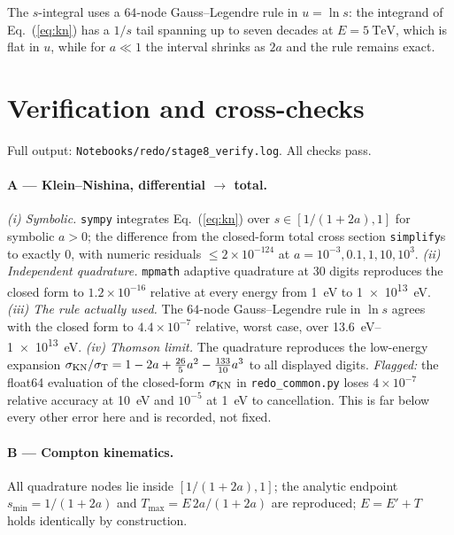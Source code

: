 \documentclass[11pt,a4paper]{article}
\begin{document}
The $s$-integral uses a $64$-node Gauss--Legendre rule in $u=\ln s$: the
integrand of Eq.~(\ref{eq:kn}) has a $1/s$ tail spanning up to seven decades
at $E=\SI{5}{\tera\electronvolt}$, which is flat in $u$, while for $a\ll1$
the interval shrinks as $2a$ and the rule remains exact.

\section{Verification and cross-checks}\label{sec:verif}

Full output: \texttt{Notebooks/redo/stage8\_verify.log}. All checks pass.

\paragraph{A --- Klein--Nishina, differential $\to$ total.}
\emph{(i) Symbolic.} \texttt{sympy} integrates Eq.~(\ref{eq:kn}) over
$s\in[1/(1+2a),1]$ for symbolic $a>0$; the difference from the closed-form
total cross section \texttt{simplify}s to exactly $0$, with numeric residuals
$\le 2\times10^{-124}$ at $a=10^{-3},0.1,1,10,10^{3}$.
\emph{(ii) Independent quadrature.} \texttt{mpmath} adaptive quadrature at
30 digits reproduces the closed form to $1.2\times10^{-16}$ relative at every
energy from \SI{1}{\electronvolt} to \SI{1e13}{\electronvolt}.
\emph{(iii) The rule actually used.} The $64$-node Gauss--Legendre rule in
$\ln s$ agrees with the closed form to $4.4\times10^{-7}$ relative, worst
case, over \SIrange{13.6}{1e13}{\electronvolt}.
\emph{(iv) Thomson limit.} The quadrature reproduces the low-energy expansion
$\sigma_{\rm KN}/\sigma_{\rm T} = 1-2a+\tfrac{26}{5}a^2-\tfrac{133}{10}a^3$
\citep[][\S22]{heitler54} to all displayed digits.
\emph{Flagged:} the float64 evaluation of the closed-form
$\sigma_{\rm KN}$ in \texttt{redo\_common.py} loses $4\times10^{-7}$ relative
accuracy at \SI{10}{\electronvolt} and $10^{-5}$ at \SI{1}{\electronvolt} to
cancellation. This is far below every other error here and is recorded, not
fixed.

\paragraph{B --- Compton kinematics.}
All quadrature nodes lie inside $[1/(1+2a),1]$; the analytic endpoint
$s_{\min}=1/(1+2a)$ and $T_{\max}=E\,2a/(1+2a)$ are reproduced;
$E=E'+T$ holds identically by construction.
\end{document}
